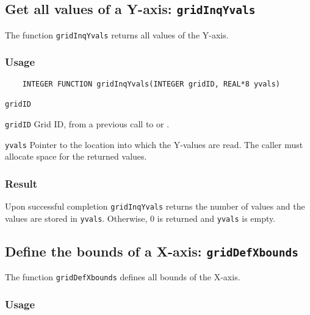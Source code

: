 \subsection{Get all values of a Y-axis: \texttt{gridInqYvals}}
\label{gridInqYvals}

The function {\texttt{gridInqYvals}} returns all values of the Y-axis.

\subsubsection*{Usage}

\begin{verbatim}
    INTEGER FUNCTION gridInqYvals(INTEGER gridID, REAL*8 yvals)
\end{verbatim}

\hspace*{4mm}\begin{minipage}[]{15cm}
\begin{deflist}{\texttt{gridID}\ }
\item[\texttt{gridID}]
Grid ID, from a previous call to {} or {}.
\item[\texttt{yvals}]
Pointer to the location into which the Y-values are read.
                    The caller must allocate space for the returned values.

\end{deflist}
\end{minipage}

\subsubsection*{Result}

Upon successful completion {\texttt{gridInqYvals}} returns the number of values and
the values are stored in {\texttt{yvals}}.
Otherwise, 0 is returned and {\texttt{yvals}} is empty.



\subsection{Define the bounds of a X-axis: \texttt{gridDefXbounds}}
\label{gridDefXbounds}

The function {\texttt{gridDefXbounds}} defines all bounds of the X-axis.

\subsubsection*{Usage}

